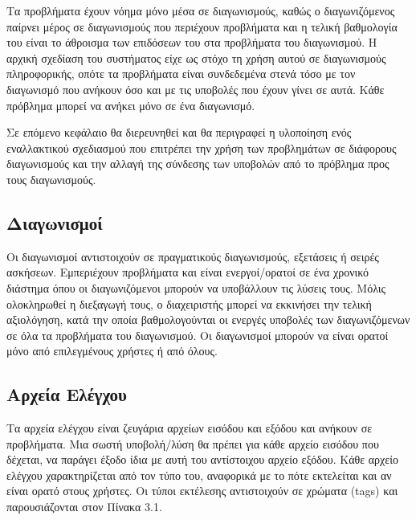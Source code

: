 \documentclass[diploma]{softlab-thesis}
\begin{document}
\bigskip

Τα προβλήματα έχουν νόημα μόνο μέσα σε διαγωνισμούς, καθώς ο διαγωνιζόμενος
παίρνει μέρος σε διαγωνισμούς που περιέχουν προβλήματα και η τελική βαθμολογία
του είναι το άθροισμα των επιδόσεων του στα προβλήματα του διαγωνισμού. Η
αρχική σχεδίαση του συστήματος είχε ως στόχο τη χρήση αυτού σε διαγωνισμούς
πληροφορικής, οπότε τα προβλήματα είναι συνδεδεμένα στενά τόσο με τον
διαγωνισμό που ανήκουν όσο και με τις υποβολές που έχουν γίνει σε αυτά. Κάθε
πρόβλημα μπορεί να ανήκει μόνο σε ένα διαγωνισμό.

\bigskip

Σε επόμενο κεφάλαιο θα διερευνηθεί και θα περιγραφεί η υλοποίηση ενός εναλλακτικού
σχεδιασμού που επιτρέπει την χρήση των προβλημάτων σε διάφορους διαγωνισμούς και
την αλλαγή της σύνδεσης των υποβολών από το πρόβλημα προς τους διαγωνισμούς.

\subsection{Διαγωνισμοί}

Οι διαγωνισμοί αντιστοιχούν σε πραγματικούς διαγωνισμούς, εξετάσεις ή σειρές
ασκήσεων. Εμπεριέχουν προβλήματα και είναι ενεργοί/ορατοί σε ένα χρονικό
διάστημα όπου οι διαγωνιζόμενοι μπορούν να υποβάλλουν τις λύσεις τους. Μόλις
ολοκληρωθεί η διεξαγωγή τους, ο διαχειριστής μπορεί να εκκινήσει την τελική
αξιολόγηση, κατά την οποία βαθμολογούνται οι ενεργές υποβολές των
διαγωνιζόμενων σε όλα τα προβλήματα του διαγωνισμού. Οι διαγωνισμοί μπορούν να
είναι ορατοί μόνο από επιλεγμένους χρήστες ή από όλους.

\subsection{Αρχεία Ελέγχου}

Τα αρχεία ελέγχου είναι ζευγάρια αρχείων εισόδου και εξόδου και ανήκουν σε
προβλήματα. Μια σωστή υποβολή/λύση θα πρέπει για κάθε αρχείο εισόδου
που δέχεται, να παράγει έξοδο ίδια με αυτή του αντίστοιχου αρχείο εξόδου.
Κάθε αρχείο ελέγχου χαρακτηρίζεται από τον τύπο του, αναφορικά με το πότε
εκτελείται και αν είναι ορατό στους χρήστες. Οι τύποι εκτέλεσης αντιστοιχούν
σε χρώματα (tags) και παρουσιάζονται στον Πίνακα 3.1.
\end{document}
